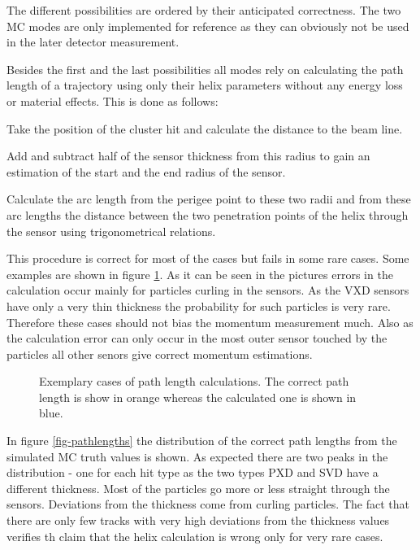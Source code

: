 The different possibilities are ordered by their anticipated correctness. The two MC modes are only implemented for reference as they can obviously not be used in the later detector measurement. 

Besides the first and the last possibilities all modes rely on calculating the path length of a trajectory using only their helix parameters without any energy loss or material effects. This is done as follows:
\begin{zlist}
 \item Take the position of the cluster hit and calculate the distance to the beam line.
 \item Add and subtract half of the sensor thickness from this radius to gain an estimation of the start and the end radius of the sensor.
 \item Calculate the arc length from the perigee point to these two radii and from these arc lengths the distance between the two penetration points of the helix through the sensor using trigonometrical relations.
\end{zlist}

This procedure is correct for most of the cases but fails in some rare cases. Some examples are shown in figure \ref{fig-errors-in-path-length}. As it can be seen in the pictures errors in the calculation occur mainly for particles curling in the sensors. As the VXD sensors have only a very thin thickness the probability for such particles is very rare. Therefore these cases should not bias the momentum measurement much. Also as the calculation error can only occur in the most outer sensor touched by the particles all other senors give correct momentum estimations.

\begin{figure}
  \centering
  \caption{Exemplary cases of path length calculations. The correct path length is show in orange whereas the calculated one is shown in blue.}
  \label{fig-errors-in-path-length}
\end{figure}

In figure \ref{fig-pathlengths} the distribution of the correct path lengths from the simulated MC truth values is shown. As expected there are two peaks in the distribution - one for each hit type as the two types PXD and SVD have a different thickness. Most of the particles go more or less straight through the sensors. Deviations from the thickness come from curling particles. The fact that there are only few tracks with very high deviations from the thickness values verifies th claim that the helix calculation is wrong only for very rare cases.

